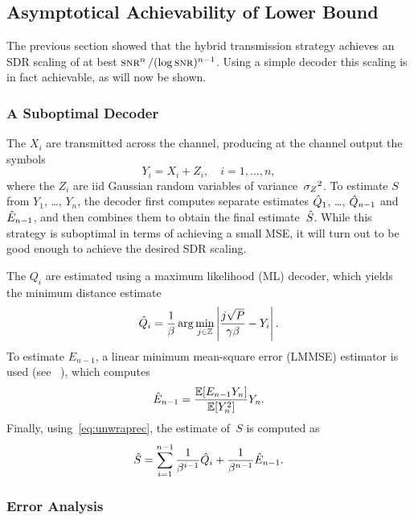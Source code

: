 \subsection{Asymptotical Achievability of Lower Bound}
\label{sec:achievable}

The previous section showed that the hybrid transmission strategy 
achieves an SDR scaling of at best $\snr^n/(\log\snr)^{n-1}$. Using a simple
decoder this scaling is in fact achievable, as will now be shown.

\subsubsection{A Suboptimal Decoder}

The $X_i$ are transmitted across the channel, producing at the channel output
the symbols
\begin{equation*}
  Y_i = X_i + Z_i, \quad i = 1, \dots, n,
\end{equation*}
where the $Z_i$ are iid Gaussian random variables of variance~${{\sigma_Z}^2}$. 
To estimate $S$ from  $Y_1$, \dots, $Y_n$, the decoder first
computes separate estimates $\hat{Q}_1$, \dots, $\hat{Q}_{n-1}$ and $\hat{E}_{n-1}$, and
then combines them to obtain the final estimate~${\hat{S}}$.  While this strategy is
suboptimal in terms of achieving a small MSE, it will turn out to be good enough
to achieve the desired SDR scaling.

The $Q_i$ are estimated using a maximum likelihood (ML) decoder, which yields
the minimum distance estimate
\begin{equation}
  \label{eq:mldecoder}
  \hat{Q}_i = \frac{1}{\beta} \arg \min_{j\in \mathbb{Z}} \left| \frac{j\sqrt{P}}
  {\gamma\beta} - Y_i \right|.
\end{equation}
To estimate $E_{n-1}$, a linear minimum mean-square error (LMMSE)
estimator is used (see \eg~\cite[Section~8.3]{Scharf1990}), which computes
\begin{equation}
  \label{eq:lmmse}
  \hat{E}_{n-1} = \frac{\mathbb{E}[E_{n-1} Y_n]}{\mathbb{E}[Y_n^2]} Y_n.
\end{equation}
Finally, using~\eqref{eq:unwraprec}, the estimate of~$S$ is computed as
\begin{equation}
  \label{eq:unwrapestim}
  {\hat{S}} = \sum_{i=1}^{n-1} \frac{1}{\beta^{i-1}} \hat{Q}_i + \frac{1}{\beta^{n-1}}
  \hat{E}_{n-1}.
\end{equation}


\subsubsection{Error Analysis}

